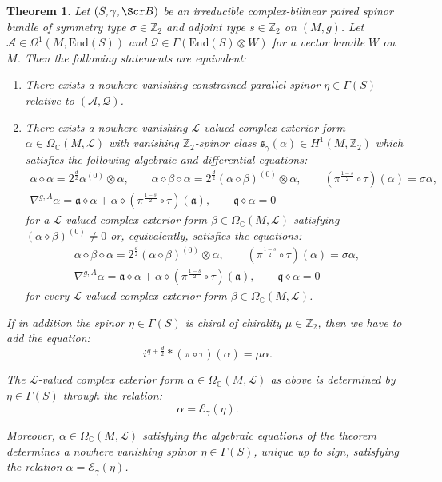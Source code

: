 \documentclass[10pt,a4paper,twoside,reqno]{amsart}
\theoremstyle{plain}
\newtheorem{thm}{Theorem}[section]
\theoremstyle{definition}
\theoremstyle{remark}
\newcommand{\End}{\mathrm{End}}
\def\Z{\mathbb{Z}}
\def\C{\mathbb{C}}
\def\cQ{\mathcal{Q}}
\def\fra{\mathfrak{a}}
\def\frq{\mathfrak{q}}
\def\scB{\Scr B}
\def\cA{\mathcal{A}}
\def\cE{\mathcal{E}}
\def\cL{\mathcal{L}}
\begin{document}
\begin{thm}\label{thm:even_CB_CPS}
Let $(S,\gamma,\scB)$ be an irreducible complex-bilinear paired spinor bundle of symmetry type $\sigma\in\Z_2$ and adjoint type $s\in\Z_2$ on $(M,g)$. Let $\cA\in\Omega^1(M,\End(S))$ and $\cQ\in\Gamma(\End(S)\otimes W)$ for a vector bundle $W$ on $M$. Then the following statements are equivalent: 
\begin{enumerate}
\item[\normalfont(a)] There exists a nowhere vanishing constrained parallel spinor $\eta\in\Gamma(S)$ relative to $(\cA,\cQ)$.
\item[\normalfont(b)] There exists a nowhere vanishing $\cL$-valued complex exterior form $\alpha\in\Omega_\C(M,\cL)$ with vanishing $\mathbb{Z}_2$-spinor class $\mathfrak{s}_{\gamma}(\alpha)\in H^1(M,\Z_2)$ which satisfies the following algebraic and differential equations: \begin{gather*}
            \alpha\diamond\alpha=2^{\frac{d}{2}}\alpha^{(0)}\otimes\alpha,\qquad \alpha\diamond\beta\diamond\alpha=2^{\frac{d}{2}}(\alpha\diamond\beta)^{(0)}\otimes\alpha,\qquad (\pi^{\frac{1-s}{2}}\circ\tau)(\alpha)=\sigma\alpha,\\
            \nabla^{g,A}\alpha=\fra\diamond\alpha+\alpha\diamond(\pi^{\frac{1-s}{2}}\circ\tau)(\fra),\qquad \frq\diamond\alpha=0
        \end{gather*} for a $\cL$-valued complex exterior form $\beta\in\Omega_\C(M,\cL)$ satisfying $(\alpha\diamond\beta)^{(0)}\neq0$ or, equivalently, satisfies the equations: \begin{gather*}
            \alpha\diamond\beta\diamond\alpha=2^{\frac{d}{2}}(\alpha\diamond\beta)^{(0)}\otimes\alpha,\qquad (\pi^{\frac{1-s}{2}}\circ\tau)(\alpha)=\sigma\alpha,\\
            \nabla^{g,A}\alpha=\fra\diamond\alpha+\alpha\diamond(\pi^{\frac{1-s}{2}}\circ\tau)(\fra),\qquad \frq\diamond\alpha=0
        \end{gather*} for every $\cL$-valued complex exterior form $\beta\in\Omega_\C(M,\cL)$.
    \end{enumerate}

    If in addition the spinor $\eta\in\Gamma(S)$ is chiral of chirality $\mu\in\Z_2$, then we have to add the equation: $$i^{q+\frac{d}{2}}*(\pi\circ\tau)(\alpha)=\mu\alpha.$$

    The $\cL$-valued complex exterior form $\alpha\in\Omega_\C(M,\cL)$ as above is determined by $\eta\in\Gamma(S)$ through the relation: $$\alpha=\cE_\gamma(\eta).$$
    
    Moreover, $\alpha\in\Omega_\C(M,\cL)$ satisfying the algebraic equations of the theorem determines a nowhere vanishing spinor $\eta\in\Gamma(S)$, unique up to sign, satisfying the relation $\alpha=\cE_\gamma(\eta)$.
\end{thm}
\end{document}
